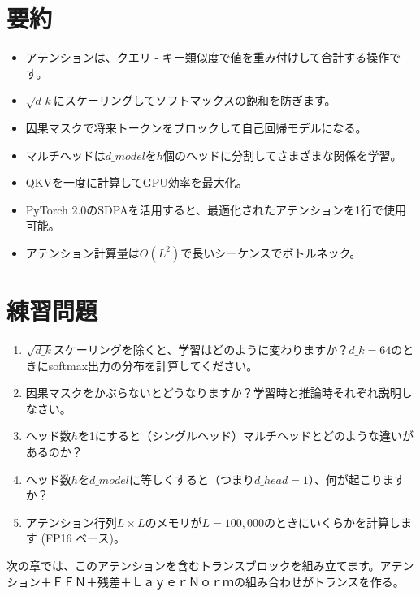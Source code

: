 \section{要約}

\begin{itemize}
\item アテンションは、クエリ - キー類似度で値を重み付けして合計する操作です。
\item $\sqrt{d\_k}$にスケーリングしてソフトマックスの飽和を防ぎます。
\item 因果マスクで将来トークンをブロックして自己回帰モデルになる。
\item マルチヘッドは$d\_{model}$を$h$個のヘッドに分割してさまざまな関係を学習。
\item QKVを一度に計算してGPU効率を最大化。
\item PyTorch 2.0のSDPAを活用すると、最適化されたアテンションを1行で使用可能。
\item アテンション計算量は$O(L^2)$で長いシーケンスでボトルネック。
\end{itemize}

\section{練習問題}

\begin{enumerate}
\item $\sqrt{d\_k}$スケーリングを除くと、学習はどのように変わりますか？$d\_k = 64$のときにsoftmax出力の分布を計算してください。
\item 因果マスクをかぶらないとどうなりますか？学習時と推論時それぞれ説明しなさい。
\item ヘッド数$h$を1にすると（シングルヘッド）マルチヘッドとどのような違いがあるのか​​？
\item ヘッド数$h$を$d\_{model}$に等しくすると（つまり$d\_{head} = 1$）、何が起こりますか？
\item アテンション行列$L \times L$のメモリが$L = 100,000$のときにいくらかを計算します (FP16 ベース)。
\end{enumerate}

次の章では、このアテンションを含むトランスブロックを組み立てます。アテンション＋ＦＦＮ＋残差＋ＬａｙｅｒＮｏｒｍの組み合わせがトランスを作る。
